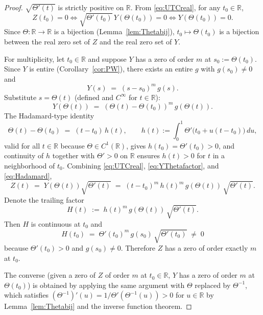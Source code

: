 \documentclass[11pt]{article}
\begin{document}
\begin{proof}
$\sqrt{\Theta'(t)}$ is strictly positive on $\mathbb{R}$. From \eqref{eq:UTCreal}, for any $t_0\in\mathbb{R}$,
\begin{equation}\label{eq:simpleZero}
Z(t_0)=0 \iff \sqrt{\Theta'(t_0)}\,Y(\Theta(t_0))=0 \iff Y(\Theta(t_0))=0.
\end{equation}
Since $\Theta:\mathbb{R}\to\mathbb{R}$ is a bijection (Lemma~\ref{lem:Thetabij}), $t_0\mapsto\Theta(t_0)$ is a bijection between the real zero set of $Z$ and the real zero set of $Y$.

For multiplicity, let $t_0\in\mathbb{R}$ and suppose $Y$ has a zero of order $m$ at $s_0:=\Theta(t_0)$. Since $Y$ is entire (Corollary~\ref{cor:PW}), there exists an entire $g$ with $g(s_0)\ne 0$ and
\begin{equation}\label{eq:Ysfactor}
Y(s) \;=\; (s-s_0)^m\,g(s).
\end{equation}
Substitute $s=\Theta(t)$ (defined and $C^\infty$ for $t\in\mathbb{R}$):
\begin{equation}\label{eq:YThetafactor}
Y(\Theta(t)) \;=\; (\Theta(t)-\Theta(t_0))^m\,g(\Theta(t)).
\end{equation}
The Hadamard-type identity
\begin{equation}\label{eq:Hadamard}
\Theta(t)-\Theta(t_0) \;=\; (t-t_0)\,h(t),\qquad h(t):=\int_0^1 \Theta'\!\big(t_0+u(t-t_0)\big)\,du,
\end{equation}
valid for all $t\in\mathbb{R}$ because $\Theta\in C^1(\mathbb{R})$, gives $h(t_0)=\Theta'(t_0)>0$, and continuity of $h$ together with $\Theta'>0$ on $\mathbb{R}$ ensures $h(t)>0$ for $t$ in a neighborhood of $t_0$. Combining \eqref{eq:UTCreal}, \eqref{eq:YThetafactor}, and \eqref{eq:Hadamard},
\begin{equation}\label{eq:Zfactor}
Z(t) \;=\; Y(\Theta(t))\sqrt{\Theta'(t)} \;=\; (t-t_0)^m\,h(t)^m\,g(\Theta(t))\,\sqrt{\Theta'(t)}.
\end{equation}
Denote the trailing factor
\begin{equation}\label{eq:Hfactor}
H(t) \;:=\; h(t)^m\,g(\Theta(t))\,\sqrt{\Theta'(t)}.
\end{equation}
Then $H$ is continuous at $t_0$ and
\begin{equation}\label{eq:Ht0}
H(t_0) \;=\; \Theta'(t_0)^m\,g(s_0)\,\sqrt{\Theta'(t_0)} \;\neq\; 0
\end{equation}
because $\Theta'(t_0)>0$ and $g(s_0)\neq 0$. Therefore $Z$ has a zero of order exactly $m$ at $t_0$.

The converse (given a zero of $Z$ of order $m$ at $t_0\in\mathbb{R}$, $Y$ has a zero of order $m$ at $\Theta(t_0)$) is obtained by applying the same argument with $\Theta$ replaced by $\Theta^{-1}$, which satisfies $(\Theta^{-1})'(u)=1/\Theta'(\Theta^{-1}(u))>0$ for $u\in\mathbb{R}$ by Lemma~\ref{lem:Thetabij} and the inverse function theorem.
\end{proof}
\end{document}
